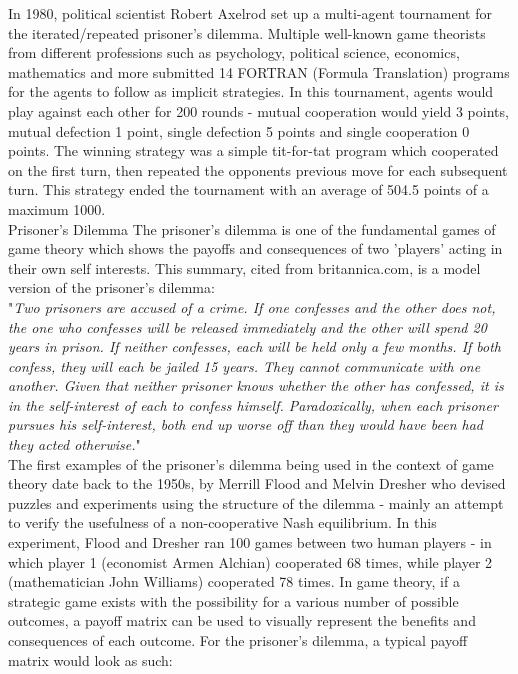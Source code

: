 \documentclass[12pt,a4paper]{article}
\makeatletter
\renewcommand\subsection{\@startsection {subsection}{1}{2mm}
                               {3pt plus 2pt minus 1pt}
                               {3pt plus 0pt}
                               {\normalfont\bfseries}}
\makeatother
\begin{document}
In 1980, political scientist Robert Axelrod set up a multi-agent tournament for the iterated/repeated prisoner's dilemma. Multiple well-known game theorists from different professions such as psychology, political science, economics, mathematics and more submitted 14 FORTRAN (Formula Translation) programs for the agents to follow as implicit strategies. In this tournament, agents would play against each other for 200 rounds - mutual cooperation would yield 3 points, mutual defection 1 point, single defection 5 points and single cooperation 0 points. The winning strategy was a simple tit-for-tat program which cooperated on the first turn, then repeated the opponents previous move for each subsequent turn. This strategy ended the tournament with an average of 504.5 points of a maximum 1000. \\

\subsection{Prisoner's Dilemma}
The prisoner's dilemma is one of the fundamental games of game theory which shows the payoffs and consequences of two 'players' acting in their own self interests. This summary, cited from britannica.com, is a model version of the prisoner's dilemma: \\

\noindent
"\textit{Two prisoners are accused of a crime. If one confesses and the other does not, the one who confesses will be released immediately and the other will spend 20 years in prison. If neither confesses, each will be held only a few months. If both confess, they will each be jailed 15 years. They cannot communicate with one another. Given that neither prisoner knows whether the other has confessed, it is in the self-interest of each to confess himself. Paradoxically, when each prisoner pursues his self-interest, both end up worse off than they would have been had they acted otherwise.}" \\

\noindent
The first examples of the prisoner's dilemma being used in the context of game theory date back to the 1950s, by Merrill Flood and Melvin Dresher who devised puzzles and experiments using the structure of the dilemma - mainly an attempt to verify the usefulness of a non-cooperative Nash equilibrium. In this experiment, Flood and Dresher ran 100 games between two human players - in which player 1 (economist Armen Alchian) cooperated 68 times, while player 2 (mathematician John Williams) cooperated 78 times. In game theory, if a strategic game exists with the possibility for a various number of possible outcomes, a payoff matrix can be used to visually represent the benefits and consequences of each outcome. For the prisoner's dilemma, a typical payoff matrix would look as such:
\end{document}
